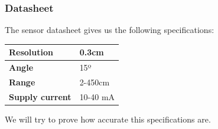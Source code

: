 \documentclass[14pt]{article}
\begin{document}
\begin{normalsize}
					
				\subsubsection{Datasheet}
					The sensor datasheet gives us the following specifications:\\
					\renewcommand{\arraystretch}{1.5}
					\begin{table}[h]
						\centering
						\begin{tabular}{|p{3cm}|p{3cm}|}
							\hline
							\textbf{Resolution}&	0.3cm\\\hline
							\textbf{Angle}			&	15º\\\hline
							\textbf{Range}			&	2-450cm\\\hline
							\textbf{Supply current} & 10-40 mA\\\hline
						\end{tabular}
					\end{table}
					We will try to prove how accurate this specifications are.
			\end{normalsize}
			
\end{document}
